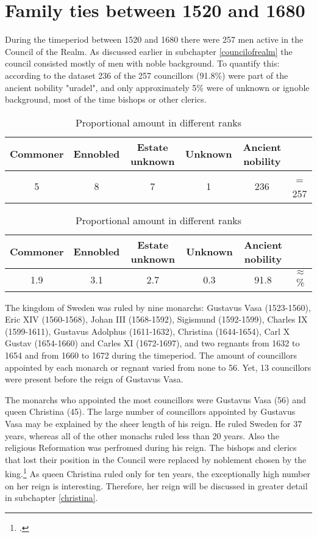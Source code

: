 \section{Family ties between 1520 and 1680}
During the timeperiod between 1520 and 1680 there were 257 men active in the Council of the Realm. As discussed earlier in subchapter \ref{councilofrealm} the council consisted mostly of men with noble background. To quantify this: according to the dataset 236 of the 257 councillors (91.8\%) were part of the ancient nobility "uradel", and only approximately 5\% were of unknown or ignoble background, most of the time bishops or other clerics.  

\begin{table}
	\caption{Absolute amount in different ranks}
	\centering
	\begin{tabular}{cccccc}
		\hline
		Commoner & Ennobled & Estate unknown & Unknown & Ancient nobility & \\
		\hline
		5 & 8 & 7 & 1 & 236 & = 257 \\
		\hline
	\end{tabular}
	\caption{Proportional amount in different ranks}
	\centering
	\begin{tabular}{cccccc}
		\hline
	    Commoner & Ennobled & Estate unknown & Unknown & Ancient nobility & \\
	    \hline
	    1.9 & 3.1 & 2.7 & 0.3 & 91.8 & $\approx$ \% \\
	\end{tabular}
\end{table}

The kingdom of Sweden was ruled by nine monarchs: Gustavus Vasa (1523-1560), Eric XIV (1560-1568), Johan III (1568-1592), Sigismund (1592-1599), Charles IX (1599-1611), Gustavus Adolphus (1611-1632), Christina (1644-1654), Carl X Gustav (1654-1660) and Carles XI (1672-1697), and two regnants from 1632 to 1654 and from 1660 to 1672 during the timeperiod. The amount of councillors appointed by each monarch or regnant varied from none to 56. Yet, 13 councillors were present before the reign of Gustavus Vasa.

The monarchs who appointed the most councillors were Gustavus Vasa (56) and queen Christina (45). The large number of councillors appointed by Gustavus Vasa may be explained by the sheer length of his reign. He ruled Sweden for 37 years, whereas all of the other monachs ruled less than 20 years. Also the religious Reformation was perfromed during his reign. The bishops and clerics that lost their position in the Council were replaced by noblement chosen by the king.\footcite[TODO]{pSuurvalta} As queen Christina ruled only for ten years, the exceptionally high number on her reign is interesting. Therefore, her reign will be discussed in greater detail in subchapter \ref{christina}. 

